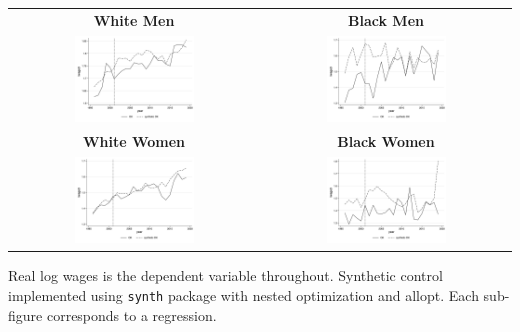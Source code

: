 \documentclass[11pt]{article}
\begin{document}
{\pagebreak
\begin{landscape}
\begin{table}[ht!]
    \centering
    \label{fig:synth_ok}
    \begin{tabular}{c c}
          \textbf{White Men} & \textbf{Black Men} \\
          \includegraphics[width = 0.5\textwidth, keepaspectratio]{figures/fin_synth_wm_ok.png} & \includegraphics[width = 0.5\textwidth, keepaspectratio]{figures/fin_synth_bm_ok.png} \\
          \textbf{White Women} & \textbf{Black Women} \\
          \includegraphics[width = 0.5\textwidth, keepaspectratio]{figures/fin_synth_wf_ok.png} & \includegraphics[width = 0.5\textwidth, keepaspectratio]{figures/fin_synth_bf_ok.png}
    \end{tabular}
\end{table}
\footnotesize{Real log wages is the dependent variable throughout. Synthetic control implemented using \texttt{synth} package with nested optimization and allopt. Each sub-figure corresponds to a regression.}
\end{landscape}

}
\end{document}
